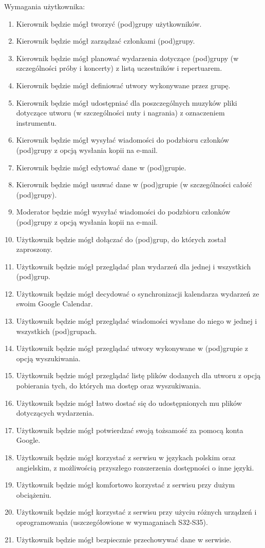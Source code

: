 \documentclass[11pt,a4paper]{article}
\renewcommand{\_}{\char`_}
\begin{document}
Wymagania użytkownika:
\begin{enumerate}
	\item Kierownik będzie mógł tworzyć (pod)grupy użytkowników.
	\item Kierownik będzie mógł zarządzać członkami (pod)grupy.
	\item Kierownik będzie mógł planować wydarzenia dotyczące (pod)grupy (w szczególności próby i koncerty) z listą uczestników i repertuarem.
	\item Kierownik będzie mógł definiować utwory wykonywane przez grupę.
	\item Kierownik będzie mógł udostępniać dla poszczególnych muzyków pliki dotyczące utworu (w szczególności nuty i nagrania) z oznaczeniem instrumentu.
	\item Kierownik będzie mógł wysyłać wiadomości do podzbioru członków (pod)grupy z opcją wysłania kopii na e-mail.
	\item Kierownik będzie mógł edytować dane w (pod)grupie.
	\item Kierownik będzie mógł usuwać dane w (pod)grupie (w szczególności całość (pod)grupy).
	\item Moderator będzie mógł wysyłać wiadomości do podzbioru członków (pod)grupy z opcją wysłania kopii na e-mail.
	\item Użytkownik będzie mógł dołączać do (pod)grup, do których został zaproszony.
	\item Użytkownik będzie mógł przeglądać plan wydarzeń dla jednej i wszystkich (pod)grup.
	\item Użytkownik będzie mógł decydować o synchronizacji kalendarza wydarzeń ze swoim Google Calendar.
	\item Użytkownik będzie mógł przeglądać wiadomości wysłane do niego w jednej i wszystkich (pod)grupach.
	\item Użytkownik będzie mógł przeglądać utwory wykonywane w (pod)grupie z opcją wyszukiwania.
	\item Użytkownik będzie mógł przeglądać listę plików dodanych dla utworu z opcją pobierania tych, do których ma dostęp oraz wyszukiwania.
	\item Użytkownik będzie mógł łatwo dostać się do udostępnionych mu plików dotyczących wydarzenia.
	\item Użytkownik będzie mógł potwierdzać swoją tożsamość za pomocą konta Google.
	\item Użytkownik będzie mógł korzystać z serwisu w językach polskim oraz angielskim, z możliwością przyszłego rozszerzenia dostępności o inne języki.
	\item Użytkownik będzie mógł komfortowo korzystać z serwisu przy dużym obciążeniu.
	\item Użytkownik będzie mógł korzystać z serwisu przy użyciu różnych urządzeń i oprogramowania (uszczegółowione w wymaganiach S32-S35).
	\item Użytkownik będzie mógł bezpiecznie przechowywać dane w serwisie.
\end{enumerate}
\end{document}
